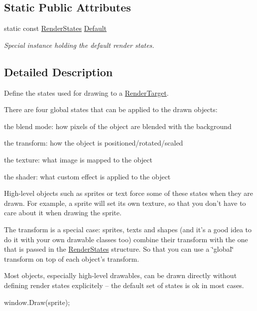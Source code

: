 \subsection*{Static Public Attributes}
\begin{DoxyCompactItemize}
\item 
\hypertarget{classsf_1_1RenderStates_ad29672df29f19ce50c3021d95f2bb062}{static const \hyperlink{classsf_1_1RenderStates}{Render\-States} \hyperlink{classsf_1_1RenderStates_ad29672df29f19ce50c3021d95f2bb062}{Default}}\label{classsf_1_1RenderStates_ad29672df29f19ce50c3021d95f2bb062}

\begin{DoxyCompactList}\small\item\em Special instance holding the default render states. \end{DoxyCompactList}\end{DoxyCompactItemize}


\subsection{Detailed Description}
Define the states used for drawing to a \hyperlink{classsf_1_1RenderTarget}{Render\-Target}. 

There are four global states that can be applied to the drawn objects\-: \begin{DoxyItemize}
\item the blend mode\-: how pixels of the object are blended with the background \item the transform\-: how the object is positioned/rotated/scaled \item the texture\-: what image is mapped to the object \item the shader\-: what custom effect is applied to the object\end{DoxyItemize}
High-\/level objects such as sprites or text force some of these states when they are drawn. For example, a sprite will set its own texture, so that you don't have to care about it when drawing the sprite.

The transform is a special case\-: sprites, texts and shapes (and it's a good idea to do it with your own drawable classes too) combine their transform with the one that is passed in the \hyperlink{classsf_1_1RenderStates}{Render\-States} structure. So that you can use a \char`\"{}global\char`\"{} transform on top of each object's transform.

Most objects, especially high-\/level drawables, can be drawn directly without defining render states explicitely -- the default set of states is ok in most cases. 
\begin{DoxyCode}
window.Draw(sprite);
\end{DoxyCode}


